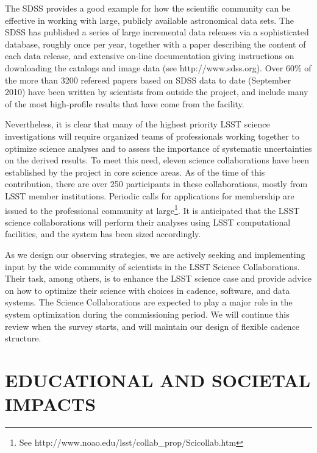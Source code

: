 \documentclass{emulateapj}
\begin{document}
The SDSS provides a good example for how the scientific 
community can be effective in working with large, publicly available
astronomical data sets. The SDSS has published a series of large incremental
data releases via a sophisticated database, roughly once per year, together with 
a paper describing the content of each data release, and extensive on-line 
documentation giving instructions on downloading the catalogs and image data
(see http://www.sdss.org). Over 60\% of the more than 3200 refereed papers based 
on SDSS data to date (September 2010) have been written by scientists from outside the project, and 
include many of the most high-profile results that have come from the facility. 

Nevertheless, it is clear that many of the highest priority LSST science
investigations will require organized teams of professionals working together
to optimize science analyses and to assess the importance of systematic 
uncertainties on the derived results. To meet this need, eleven science
collaborations have been established by the project in core science
areas. As of the time of this contribution, there 
are over 250 participants in these collaborations, mostly from LSST 
member institutions. Periodic
calls for applications for membership are issued to the professional 
community at large\footnote{See http://www.noao.edu/lsst/collab\_prop/Scicollab.htm}.
It is anticipated that the LSST science collaborations 
will perform their analyses using LSST computational facilities, and the 
system has been sized accordingly. 

As we design our observing strategies, we are actively seeking and implementing
input by the wide community of scientists in the LSST Science Collaborations. 
Their task, among others, is to enhance the LSST science case and provide
advice on how to optimize their science with choices in cadence, software, 
and data systems. The Science Collaborations are expected to play a major role 
in the system optimization during the commissioning period. We will continue 
this review when the survey starts, and will maintain our design of flexible 
cadence structure.



\section{   EDUCATIONAL AND SOCIETAL IMPACTS    }
\label{Sec:impact}
\end{document}
